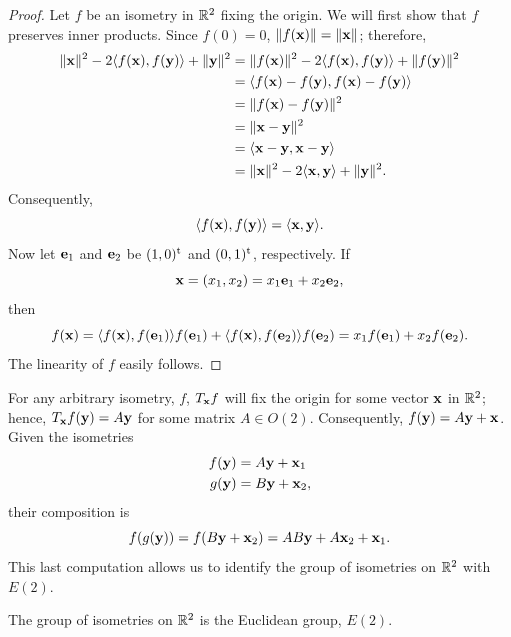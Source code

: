  
\begin{proof}
Let $f$ be an isometry in ${\Bbb R}^2$ fixing the origin. We will
first show that $f$ preserves inner products. Since $f(0) = 0$, $\|
f({\bold x})\| = \| {\bold x} \|$; therefore,
\begin{align*}
\| {\bold x} \|^2 - 2 \langle f({\bold x}), f({\bold y}) \rangle + \|
{\bold y} \|^2 
& =
\| f({\bold x}) \|^2 - 2 \langle f({\bold x}), f({\bold y}) \rangle +
\| f({\bold y}) \|^2 \\ 
& =
\langle
f({\bold x}) -  f({\bold y}), f({\bold x}) -  f({\bold y})
\rangle \\
& =
\| f({\bold x}) -  f({\bold y}) \|^2 \\
& =
\| {\bold x} -  {\bold y} \|^2 \\
& =
\langle
{\bold x} -  {\bold y}, {\bold x} -  {\bold y} \rangle \\
& =
\| {\bold x} \|^2 - 2 \langle {\bold x}, {\bold y} \rangle + \| {\bold
y} \|^2. 
\end{align*}
Consequently,
\[
\langle f({\bold x}), f({\bold y}) \rangle
=
\langle {\bold x}, {\bold y} \rangle.
\]
Now let ${\bold e}_1$ and ${\bold e_2}$ be $(1, 0)^{\rm t}$ and $(0,
1)^{\rm t}$, respectively. If 
\[
{\bold x} = (x_1, x_2) = x_1 {\bold e}_1 + x_2 {\bold e}_2,
\]
then
\[
f({\bold x})
=
\langle
f({\bold x}), f({\bold e}_1)
\rangle
f({\bold e}_1)
+\langle
f({\bold x}), f({\bold e}_2)
\rangle
f({\bold e}_2)
=
x_1 f({\bold e}_1)+x_2 f({\bold e}_2).
\]
The linearity of $f$ easily follows.
\end{proof}
 
 
\medskip
 
 
For any arbitrary isometry, $f$,  $T_{\bold x} f$ will fix the origin
for some vector ${\bold x}$ in ${\Bbb R}^2$; hence, $T_{\bold x}
f({\bold y}) = A {\bold y}$ for some matrix $A \in O(2)$.
Consequently, $f({\bold y}) = A {\bold y} + {\bold x}$.  Given the
isometries 
\begin{align*}
f({\bold y}) & = A {\bold y} + {\bold x}_1 \\
g({\bold y}) & = B {\bold y} + {\bold x}_2,
\end{align*}
their composition is
\[
f(g({\bold y})) =
f(B {\bold y} + {\bold x}_2) =
AB {\bold y} + A{\bold x}_2 + {\bold x}_1.
\]
This last computation allows us to identify the group of isometries on
${\Bbb R}^2$ with~$E(2)$. 
 
 
\begin{theorem}
The group of isometries on ${\Bbb R}^2$ is the Euclidean group,
$E(2)$. 
\end{theorem}
 
